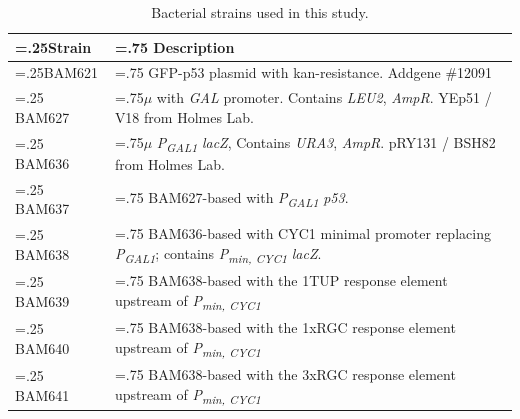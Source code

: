 \begin{table}[H]
\centering
\renewcommand{\arraystretch}{1.2}
{
\begin{tabularx}{\textwidth}{|>{\hsize=.25\hsize}X|>{\hsize=.75\hsize}X|}
\hline
Strain & Description \\
\hline
BAM621 & GFP-p53 plasmid with kan-resistance. Addgene \#12091\\
\hline
BAM627 & 2\(\mu\) with \textit{GAL} promoter. Contains \textit{LEU2}, \textit{AmpR}. YEp51 / V18 from Holmes Lab. \\
\hline
BAM636 & 2\(\mu\) \textit{P\textsubscript{GAL1}} \textminus{} \textit{lacZ}, Contains \textit{URA3}, \textit{AmpR}. pRY131 / BSH82 from Holmes Lab. \\
\hline
BAM637 & BAM627-based with \textit{P\textsubscript{GAL1}} \textminus{} \textit{p53}. \\
\hline
BAM638 & BAM636-based with CYC1 minimal promoter replacing \textit{P\textsubscript{GAL1}}; contains \textit{P\textsubscript{min, CYC1}} \textminus{} \textit{lacZ}. \\
\hline
BAM639 & BAM638-based with the 1TUP response element upstream of \textit{P\textsubscript{min, CYC1}} \\
\hline
BAM640 & BAM638-based with the 1xRGC response element upstream of \textit{P\textsubscript{min, CYC1}} \\
\hline
BAM641 & BAM638-based with the 3xRGC response element upstream of \textit{P\textsubscript{min, CYC1}} \\
\hline
\end{tabularx}
}
\caption[Bacterial Strain Table]{Bacterial strains used in this study.}
\label{tab:bacterial-strains}
\end{table}

